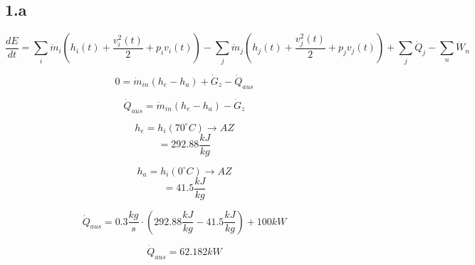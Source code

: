 \subsection*{1.a}
\begin{equation*}
\frac{dE}{dt} = \sum_i \dot{m}_i (h_i(t) + \frac{v_i^2(t)}{2} + p_i v_i(t)) - \sum_j \dot{m}_j (h_j(t) + \frac{v_j^2(t)}{2} + p_j v_j(t)) + \sum_j \dot{Q}_j - \sum_n \dot{W}_n
\end{equation*}

\begin{equation*}
0 = \dot{m}_{in} (h_e - h_a) + \dot{G}_z - \dot{Q}_{aus}
\end{equation*}

\begin{equation*}
\dot{Q}_{aus} = \dot{m}_{in} (h_e - h_a) - \dot{G}_z
\end{equation*}

\begin{equation*}
h_e = h_i (70^\circ C) \rightarrow AZ
\end{equation*}
\begin{equation*}
= 292.88 \frac{kJ}{kg}
\end{equation*}

\begin{equation*}
h_a = h_i (0^\circ C) \rightarrow AZ
\end{equation*}
\begin{equation*}
= 41.5 \frac{kJ}{kg}
\end{equation*}

\begin{equation*}
\dot{Q}_{aus} = 0.3 \frac{kg}{s} \cdot (292.88 \frac{kJ}{kg} - 41.5 \frac{kJ}{kg}) + 100 kW
\end{equation*}

\begin{equation*}
\dot{Q}_{aus} = 62.182 kW
\end{equation*}